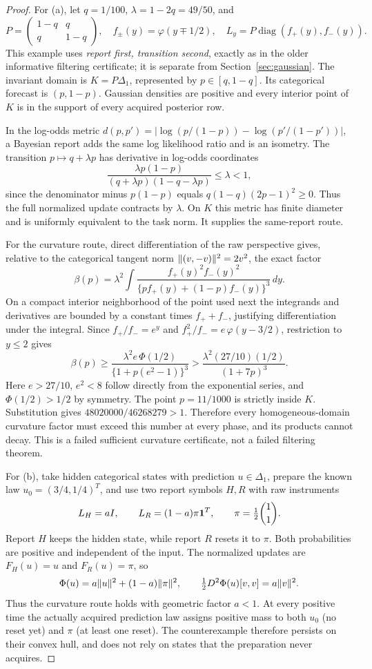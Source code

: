 \begin{proof}
For (a), let $q=1/100$, $\lambda=1-2q=49/50$, and
\[
 P=\begin{pmatrix}1-q&q\\q&1-q\end{pmatrix},\quad
 f_\pm(y)=\varphi(y\mp1/2),\quad L_y=P\operatorname{diag}(f_+(y),f_-(y)).
\]
This example uses \emph{report first, transition second}, exactly as in the older informative filtering certificate; it is separate from Section~\ref{sec:gaussian}. The invariant domain is $K=P\Delta_1$, represented by $p\in[q,1-q]$. Its categorical forecast is $(p,1-p)$. Gaussian densities are positive and every interior point of $K$ is in the support of every acquired posterior row.

In the log-odds metric $d(p,p')=|\log(p/(1-p))-\log(p'/(1-p'))|$, a Bayesian report adds the same log likelihood ratio and is an isometry. The transition $p\mapsto q+\lambda p$ has derivative in log-odds coordinates
\[
 \frac{\lambda p(1-p)}{(q+\lambda p)(1-q-\lambda p)}\le\lambda<1,
\]
since the denominator minus $p(1-p)$ equals $q(1-q)(2p-1)^2\ge0$. Thus the full normalized update contracts by $\lambda$. On $K$ this metric has finite diameter and is uniformly equivalent to the task norm. It supplies the same-report route.

For the curvature route, direct differentiation of the raw perspective gives, relative to the categorical tangent norm $\lVert(v,-v)\rVert^2=2v^2$, the exact factor
\[
 \beta(p)=\lambda^2\int
       \frac{f_+(y)^2f_-(y)^2}
            {\{p f_+(y)+(1-p)f_-(y)\}^3}\,dy.
\]
On a compact interior neighborhood of the point used next the integrands and derivatives are bounded by a constant times $f_++f_-$, justifying differentiation under the integral. Since $f_+/f_-=e^y$ and $f_+^2/f_-=e\,\varphi(y-3/2)$, restriction to $y\le2$ gives
\[
 \beta(p)\ge
 \frac{\lambda^2e\,\Phi(1/2)}{\{1+p(e^2-1)\}^3}
 >\frac{\lambda^2(27/10)(1/2)}{(1+7p)^3}.
\]
Here $e>27/10$, $e^2<8$ follow directly from the exponential series, and $\Phi(1/2)>1/2$ by symmetry. The point $p=11/1000$ is strictly inside $K$. Substitution gives $48020000/46268279>1$. Therefore every homogeneous-domain curvature factor must exceed this number at every phase, and its products cannot decay. This is a failed sufficient curvature certificate, not a failed filtering theorem.

For (b), take hidden categorical states with prediction $u\in\Delta_1$, prepare the known law $u_0=(3/4,1/4)^T$, and use two report symbols $H,R$ with raw instruments
\[
 L_H=aI,\qquad L_R=(1-a)\pi\mathbf1^T,
 \qquad \pi=\tfrac12\binom11.
\]
Report $H$ keeps the hidden state, while report $R$ resets it to $\pi$. Both probabilities are positive and independent of the input. The normalized updates are $F_H(u)=u$ and $F_R(u)=\pi$, so
\[
 \Phi(u)=a\lVert u\rVert^2+(1-a)\lVert\pi\rVert^2,
 \qquad\tfrac12D^2\Phi(u)[v,v]=a\lVert v\rVert^2.
\]
Thus the curvature route holds with geometric factor $a<1$. At every positive time the actually acquired prediction law assigns positive mass to both $u_0$ (no reset yet) and $\pi$ (at least one reset). The counterexample therefore persists on their convex hull, and does not rely on states that the preparation never acquires.


\end{proof}
